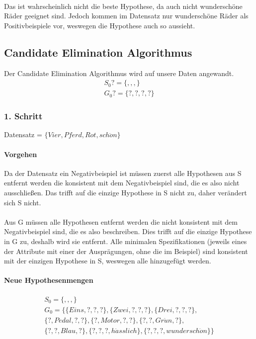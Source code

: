 \documentclass[a4paper]{article}
\begin{document}
\paragraph{}
Das ist wahrscheinlich nicht die beste Hypothese, da auch nicht wunderschöne Räder geeignet sind. Jedoch kommen im Datensatz nur wunderschöne Räder als Positivbeispiele vor, weswegen die Hypothese auch so aussieht.

\subsection{Candidate Elimination Algorithmus}
Der Candidate Elimination Algorithmus wird auf unsere Daten angewandt.
\begin{align*}
	S_0 ?= \{,,,\} \\
	G_0 ?= \{?,?,?,?\}
\end{align*}

\subsubsection{1. Schritt}
Datensatz = $ \{Vier, Pferd, Rot, sch\ddot{o}n\} $
\paragraph{Vorgehen}
Da der Datensatz ein Negativbeispiel ist müssen zuerst alle Hypothesen aus S entfernt werden die konsistent mit dem Negativbeispiel sind, die es also nicht ausschließen. Das trifft auf die einzige Hypothese in S nicht zu, daher verändert sich S nicht.
\paragraph{}
Aus G müssen alle Hypothesen entfernt werden die nicht konsistent mit dem Negativbeispiel sind, die es also beschreiben. Dies trifft auf die einzige Hypothese in G zu, deshalb wird sie entfernt. Alle minimalen Spezifikationen (jeweils eines der Attribute mit einer der Ausprägungen, ohne die im Beispiel) sind konsistent mit der einzigen Hypothese in S, weswegen alle hinzugefügt werden.
\paragraph{Neue Hypothesenmengen}
\begin{align*}
	S_0 = \{,,,\} \\
	G_0 = \{ \{Eins,?,?,?\}, \{Zwei,?,?,?\}, \{Drei,?,?,?\}, \\
	\{?,Pedal,?,?\}, \{?,Motor,?,?\}, \{?,?,Gr\ddot{u}n,?\}, \\ 
	\{?,?,Blau,?\}, \{?,?,?,h\ddot{a}sslich\}, \{?,?,?,wundersch\ddot{o}n\} \}
\end{align*}
\end{document}
